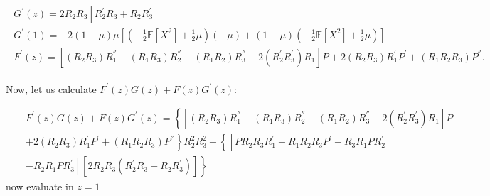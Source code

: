 \documentclass{article}
\newcommand{\esp}{\mathbb{E}}
\begin{document}
\begin{eqnarray}
\begin{array}{l}
G^{'}\left(z\right)=2R_{2}R_{3}\left[R_{2}^{'}R_{3}+R_{2}R_{3}^{'}\right]\\
G^{'}\left(1\right)=-2\left(1-\mu\right)\mu\left[\left(-\frac{1}{2}\esp\left[X^{2}\right]+\frac{1}{2}\mu\right)\left(-\mu\right)+\left(1-\mu\right)\left(-\frac{1}{2}\esp\left[X^{2}\right]+\frac{1}{2}\mu\right)\right]\\
F^{'}\left(z\right)=\left[\left(R_{2}R_{3}\right)R_{1}^{''}
-\left(R_{1}R_{3}\right)R_{2}^{''}
-\left(R_{1}R_{2}\right)R_{3}^{''}
-2\left(R_{2}^{'}R_{3}^{'}\right)R_{1}\right]P
+2\left(R_{2}R_{3}\right)R_{1}^{'}P^{'}
+\left(R_{1}R_{2}R_{3}\right)P^{''}.
\end{array}
\end{eqnarray}

Now, let us calculate $F^{'}\left(z\right)G\left(z\right)+F\left(z\right)G^{'}\left(z\right)$:

\begin{eqnarray*}
&&F^{'}\left(z\right)G\left(z\right)+F\left(z\right)G^{'}\left(z\right)=
\left\{\left[\left(R_{2}R_{3}\right)R_{1}^{''}
-\left(R_{1}R_{3}\right)R_{2}^{''}
-\left(R_{1}R_{2}\right)R_{3}^{''}
-2\left(R_{2}^{'}R_{3}^{'}\right)R_{1}\right]P\right.\\
&&\left.+2\left(R_{2}R_{3}\right)R_{1}^{'}P^{'}
+\left(R_{1}R_{2}R_{3}\right)P^{''}\right\}R_{2}^{2}R_{3}^{2}
-\left\{\left[PR_{2}R_{3}R_{1}^{'}+R_{1}R_{2}R_{3}P^{'}
-R_{3}R_{1}PR_{2}^{'}\right.\right.\\
&&\left.\left.
-R_{2}R_{1}PR_{3}^{'}\right]\left[2R_{2}R_{3}\left(R_{2}^{'}R_{3}+R_{2}R_{3}^{'}\right)\right]\right\}
\end{eqnarray*}
now evaluate in $z=1$
\end{document}
